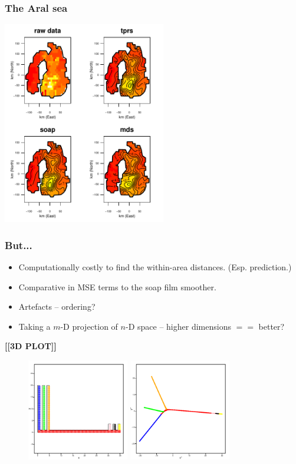 \documentclass[ignorenonframetext]{beamer} %
\newcommand{\bi}{\begin{itemize}}
\newcommand{\ei}{\end{itemize}}
\begin{document}
\begin{frame}
	\frametitle{The Aral sea}
            \centering
              \includegraphics[height=3.5in]{figs/aral-fit.pdf}\\
\end{frame}

\begin{frame}
	\frametitle{But...}
          \bi
            \item Computationally costly to find the within-area distances. (Esp. prediction.)
            \item Comparative in MSE terms to the soap film smoother.
            \item Artefacts -- ordering?
            \item Taking a $m$-D projection of $n$-D space -- higher dimensions $==$ better?
           \ei
	\textbf{[[3D PLOT]]}
	\begin{figure}
	         	\centering
              \includegraphics[height=1.75in]{figs/comb.pdf} \includegraphics[height=1.75in]{figs/comb-2d.pdf}
	\end{figure}
\end{frame}
\end{document}
